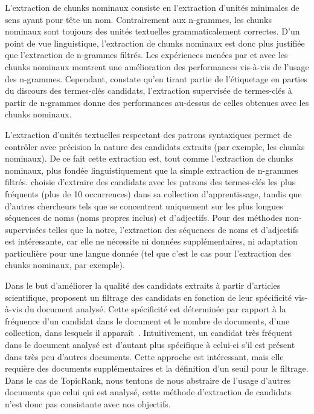     L'extraction de chunks nominaux consiste en l'extraction d'unités
    minimales de sens ayant pour tête un nom. Contrairement aux n-grammes, les
    chunks nominaux sont toujours des unités textuelles grammaticalement
    correctes. D'un point de vue linguistique, l'extraction de chunks nominaux
    est donc plus justifiée que l'extraction de n-grammes filtrés. Les
    expériences menées par  et
     avec les chunks nominaux montrent une
    amélioration des performances vis-à-vis de l'usage des n-grammes.
    Cependant,  constate qu'en tirant partie
    de l'étiquetage en parties du discours des termes-clés candidats,
    l'extraction supervisée de termes-clés à partir de n-grammes donne des
    performances au-dessus de celles obtenues avec les chunks nominaux.

    L'extraction d'unités textuelles respectant des patrons syntaxiques permet
    de contrôler avec précision la nature des candidats extraits (par exemple,
    les chunks nominaux). De ce fait cette extraction est, tout comme
    l'extraction de chunks nominaux, plus fondée linguistiquement que la simple
    extraction de n-grammes filtrés. 
    choisie d'extraire des candidats avec les patrons des termes-clés les plus
    fréquents (plus de 10 occurrences) dans sa collection d'apprentissage,
    tandis que d'autres chercheurs tels que  se
    concentrent uniquement sur les plus longues séquences de noms (noms propres
    inclus) et d'adjectifs. Pour des méthodes non-supervisées telles que la
    notre, l'extraction des séquences de noms et d'adjectifs est intéressante,
    car elle ne nécessite ni données supplémentaires, ni adaptation particulière
    pour une langue donnée (tel que c'est le cas pour l'extraction des chunks
    nominaux, par exemple).

    Dans le but d'améliorer la qualité des candidats extraits à partir
    d'articles scientifique,  proposent un
    filtrage des candidats en fonction de leur spécificité vis-à-vis du document
    analysé. Cette spécificité est déterminée par rapport à la fréquence d'un
    candidat dans le document et le nombre de documents, d'une collection, dans
    lesquels il apparaît~\cite[TF-IDF]{jones1972tfidf}. Intuitivement, un
    candidat très fréquent dans le document analysé est d'autant plus spécifique
    à celui-ci s'il est présent dans très peu d'autres documents. Cette approche
    est intéressant, mais elle requière des documents  supplémentaires et la
    définition d'un seuil pour le filtrage. Dans le cas de TopicRank, nous
    tentons de nous abstraire de l'usage d'autres documents que celui qui est
    analysé, cette méthode d'extraction de candidats n'est donc pas consistante
    avec nos objectifs.

